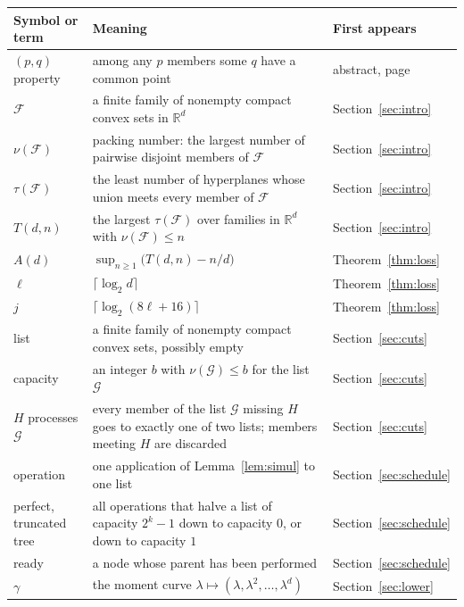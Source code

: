 \documentclass[11pt]{amsart}
\theoremstyle{remark}
\newcommand{\R}{\mathbb R}
\newcommand{\F}{\mathcal F}
\newcommand{\G}{\mathcal G}
\newcommand{\ceil}[1]{\lceil #1\rceil}
\begin{document}
\begin{center}
\begin{tabular}{@{}>{\raggedright\arraybackslash}p{}>{\raggedright\arraybackslash}p{}>{\raggedright\arraybackslash}p{}@{}}
\toprule
Symbol or term & Meaning & First appears \\
\midrule
$(p,q)$ property & among any $p$ members some $q$ have a common point & abstract, page~\pageref{abs:start} \\
$\F$ & a finite family of nonempty compact convex sets in $\R^d$ & Section~\ref{sec:intro} \\
$\nu(\F)$ & packing number: the largest number of pairwise disjoint members of $\F$ & Section~\ref{sec:intro} \\
$\tau(\F)$ & the least number of hyperplanes whose union meets every member of $\F$ & Section~\ref{sec:intro} \\
$T(d,n)$ & the largest $\tau(\F)$ over families in $\R^d$ with $\nu(\F)\le n$ & Section~\ref{sec:intro} \\
$A(d)$ & $\sup_{n\ge1}\bigl(T(d,n)-n/d\bigr)$ & Theorem~\ref{thm:loss} \\
$\ell$ & $\ceil{\log_2 d}$ & Theorem~\ref{thm:loss} \\
$j$ & $\ceil{\log_2(8\ell+16)}$ & Theorem~\ref{thm:loss} \\
list & a finite family of nonempty compact convex sets, possibly empty & Section~\ref{sec:cuts} \\
capacity & an integer $b$ with $\nu(\G)\le b$ for the list $\G$ & Section~\ref{sec:cuts} \\
$H$ processes $\G$ & every member of the list $\G$ missing $H$ goes to exactly one of two lists; members meeting $H$ are discarded & Section~\ref{sec:cuts} \\
operation & one application of Lemma~\ref{lem:simul} to one list & Section~\ref{sec:schedule} \\
perfect, truncated tree & all operations that halve a list of capacity $2^k-1$ down to capacity $0$, or down to capacity $1$ & Section~\ref{sec:schedule} \\
ready & a node whose parent has been performed & Section~\ref{sec:schedule} \\
$\gamma$ & the moment curve $\lambda\mapsto(\lambda,\lambda^2,\dots,\lambda^d)$ & Section~\ref{sec:lower} \\
\bottomrule
\end{tabular}
\end{center}
\end{document}
